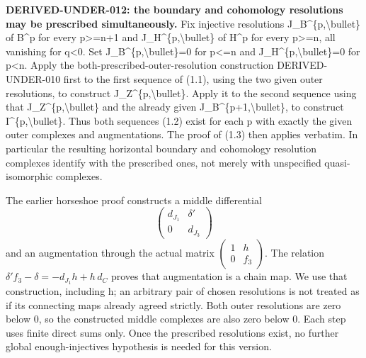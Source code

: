 \documentclass[11pt]{article}
\begin{document}
\textbf{DERIVED-UNDER-012:\allowbreak{} the boundary and cohomology resolutions may be prescribed simultaneously.} Fix injective resolutions J\_\allowbreak{}B\textasciicircum{}\{p,\allowbreak{}\textbackslash{}bullet\} of B\^{}p for every p>\allowbreak{}=n\allowbreak{}+1 and J\_\allowbreak{}H\textasciicircum{}\{p,\allowbreak{}\textbackslash{}bullet\} of H\^{}p for every p>\allowbreak{}=n,\allowbreak{} all vanishing for q\textless0. Set J\_\allowbreak{}B\textasciicircum{}\{p,\allowbreak{}\textbackslash{}bullet\}\allowbreak{}=0 for p<\allowbreak{}=n and J\_\allowbreak{}H\textasciicircum{}\{p,\allowbreak{}\textbackslash{}bullet\}\allowbreak{}=0 for p\textless n. Apply the both-prescribed-outer-resolution construction DERIVED-UNDER-010 first to the first sequence of (1.1)\allowbreak{},\allowbreak{} using the two given outer resolutions,\allowbreak{} to construct J\_\allowbreak{}Z\textasciicircum{}\{p,\allowbreak{}\textbackslash{}bullet\}. Apply it to the second sequence using that J\_\allowbreak{}Z\textasciicircum{}\{p,\allowbreak{}\textbackslash{}bullet\} and the already given J\_\allowbreak{}B\textasciicircum{}\{p\allowbreak{}+1,\allowbreak{}\textbackslash{}bullet\},\allowbreak{} to construct I\textasciicircum{}\{p,\allowbreak{}\textbackslash{}bullet\}. Thus both sequences (1.2)\allowbreak{} exist for each p with exactly the given outer complexes and augmentations. The proof of (1.3)\allowbreak{} then applies verbatim. In particular the resulting horizontal boundary and cohomology resolution complexes identify with the prescribed ones,\allowbreak{} not merely with unspecified quasi-isomorphic complexes.

The earlier horseshoe proof constructs a middle differential \[
 \begin{pmatrix}d_{J_1}&\delta'\\0&d_{J_3}\end{pmatrix}
\] and an augmentation through the actual matrix \(\left(\begin{smallmatrix}1&h\\0&f_3\end{smallmatrix}\right)\). The relation \(\delta'f_3-\delta=-d_{J_1}h+h\,d_C\) proves that augmentation is a chain map. We use that construction,\allowbreak{} including h; an arbitrary pair of chosen resolutions is not treated as if its connecting maps already agreed strictly. Both outer resolutions are zero below 0,\allowbreak{} so the constructed middle complexes are also zero below 0. Each step uses finite direct sums only. Once the prescribed resolutions exist,\allowbreak{} no further global enough-injectives hypothesis is needed for this version.
\end{document}
